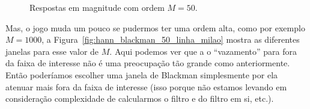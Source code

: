 \documentclass{homeworkclass}
\begin{document}
\begin{homeworkProblem}
\begin{figure}[!h]
	\caption{Respostas em magnitude com ordem $M = 50$.}
	\label{fig:hann_blackman_50_linha}
\end{figure}

Mas, o jogo muda um pouco se pudermos ter uma ordem alta, como por exemplo $M = 1000$, a Figura~\ref{fig:hann_blackman_50_linha_milao} mostra as diferentes janelas para esse valor de $M$. Aqui podemos ver que a o ``vazamento'' para fora da faixa de interesse não é uma preocupação tão grande como anteriormente. Então poderíamos escolher uma janela de Blackman simplesmente por ela atenuar mais fora da faixa de interesse (isso porque não estamos levando em consideração complexidade de calcularmos o filtro e do filtro em si, etc.).

\begin{figure}[!h]
	\centering
	~
	\\

\end{figure}
\end{homeworkProblem}
\end{document}
